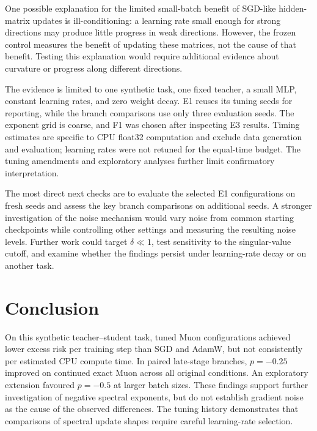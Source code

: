 \documentclass[11pt,a4paper]{article}
\begin{document}
One possible explanation for the limited small-batch benefit of SGD-like hidden-matrix updates is ill-conditioning: a learning rate small enough for strong directions may produce little progress in weak directions. However, the frozen control measures the benefit of updating these matrices, not the cause of that benefit. Testing this explanation would require additional evidence about curvature or progress along different directions.

The evidence is limited to one synthetic task, one fixed teacher, a small MLP, constant learning rates, and zero weight decay. E1 reuses its tuning seeds for reporting, while the branch comparisons use only three evaluation seeds. The exponent grid is coarse, and F1 was chosen after inspecting E3 results. Timing estimates are specific to CPU float32 computation and exclude data generation and evaluation; learning rates were not retuned for the equal-time budget. The tuning amendments and exploratory analyses further limit confirmatory interpretation.

The most direct next checks are to evaluate the selected E1 configurations on fresh seeds and assess the key branch comparisons on additional seeds. A stronger investigation of the noise mechanism would vary noise from common starting checkpoints while controlling other settings and measuring the resulting noise levels. Further work could target $\delta\ll1$, test sensitivity to the singular-value cutoff, and examine whether the findings persist under learning-rate decay or on another task.

\section{Conclusion}\label{sec:conclusion}
On this synthetic teacher--student task, tuned Muon configurations achieved lower excess risk per training step than SGD and AdamW, but not consistently per estimated CPU compute time. In paired late-stage branches, $p=-0.25$ improved on continued exact Muon across all original conditions. An exploratory extension favoured $p=-0.5$ at larger batch sizes. These findings support further investigation of negative spectral exponents, but do not establish gradient noise as the cause of the observed differences. The tuning history demonstrates that comparisons of spectral update shapes require careful learning-rate selection.
\end{document}
